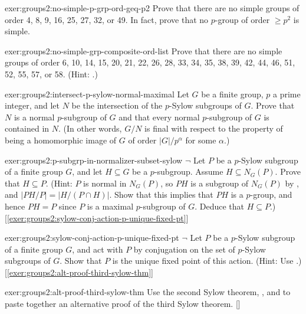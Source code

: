 \begin{exer}{}{exer:groups2:no-simple-p-grp-ord-geq-p2}
  Prove that there are no simple groups of order 4, 8, 9, 16, 25, 27,
  32, or 49. In fact, prove that no $p$-group of order $\geq p^2$ is
  simple.
\end{exer}
\begin{exer}{}{exer:groups2:no-simple-grp-composite-ord-list}
  Prove that there are no simple groups of order 6, 10, 14, 15, 20,
  21, 22, 26, 28, 33, 34, 35, 38, 39, 42, 44, 46, 51, 52, 55, 57, or
  58. (Hint: .)
\end{exer}
\begin{exer}{}{exer:groups2:intersect-p-sylow-normal-maximal}
  Let $G$ be a finite group, $p$ a prime integer, and let $N$ be the
  intersection of the $p$-Sylow subgroups of $G$. Prove that $N$ is a
  normal $p$-subgroup of $G$ and that every normal $p$-subgroup of $G$
  is contained in $N$. (In other words, $G/N$ is final with respect to
  the property of being a homomorphic image of $G$ of order
  $|G|/p^\alpha$ for some $\alpha$.)
\end{exer}
\begin{exer}{}{exer:groups2:p-subgrp-in-normalizer-subset-sylow}
  $\lnot$ Let $P$ be a $p$-Sylow subgroup of a finite group $G$, and
  let $H \subseteq G$ be a $p$-subgroup. Assume $H \subseteq
  N_G(P)$. Prove that $H \subseteq P$. (Hint: $P$ is normal in
  $N_G(P)$, so $PH$ is a subgroup of $N_G(P)$ by
  , and
  $|PH/P| = |H/(P \cap H)|$. Show that this implies that $PH$ is a
  $p$-group, and hence $PH = P$ since $P$ is a maximal $p$-subgroup of
  $G$. Deduce that $H \subseteq P$.)
  [\ref{exer:groups2:sylow-conj-action-p-unique-fixed-pt}]
\end{exer}
\begin{exer}{}{exer:groups2:sylow-conj-action-p-unique-fixed-pt}
  $\lnot$ Let $P$ be a $p$-Sylow subgroup of a finite group $G$, and
  act with $P$ by conjugation on the set of $p$-Sylow subgroups of
  $G$. Show that $P$ is the unique fixed point of this action. (Hint:
  Use .)
  [\ref{exer:groups2:alt-proof-third-sylow-thm}]
\end{exer}
\begin{exer}{}{exer:groups2:alt-proof-third-sylow-thm}
  \exerused{} Use the second Sylow theorem,
  , and
   to paste
  together an alternative proof of the third Sylow theorem. []
\end{exer}
